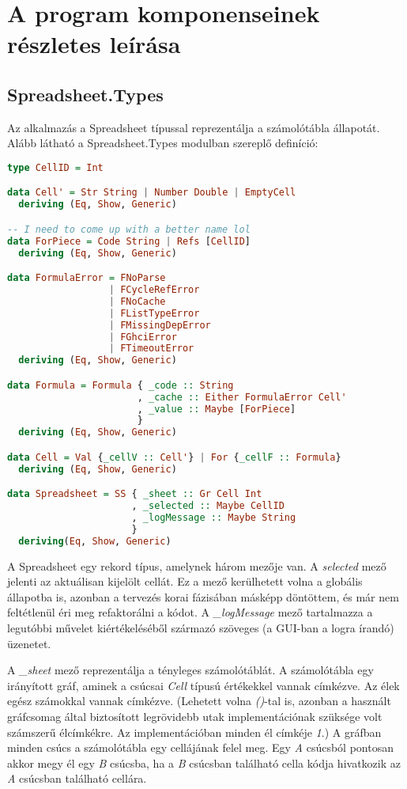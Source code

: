 \section{A program komponenseinek részletes leírása}

\subsection{Spreadsheet.Types}

Az alkalmazás a Spreadsheet típussal reprezentálja a számolótábla állapotát. Alább látható a Spreadsheet.Types modulban szereplő definíció:

\begin{lstlisting}[language={Haskell}]
type CellID = Int

data Cell' = Str String | Number Double | EmptyCell
  deriving (Eq, Show, Generic)

-- I need to come up with a better name lol
data ForPiece = Code String | Refs [CellID]
  deriving (Eq, Show, Generic)

data FormulaError = FNoParse
                  | FCycleRefError
                  | FNoCache
                  | FListTypeError
                  | FMissingDepError
                  | FGhciError
                  | FTimeoutError
  deriving (Eq, Show, Generic)

data Formula = Formula { _code :: String
                       , _cache :: Either FormulaError Cell'
                       , _value :: Maybe [ForPiece]
                       }
  deriving (Eq, Show, Generic)

data Cell = Val {_cellV :: Cell'} | For {_cellF :: Formula}
  deriving (Eq, Show, Generic)

data Spreadsheet = SS { _sheet :: Gr Cell Int
                      , _selected :: Maybe CellID
                      , _logMessage :: Maybe String
                      }
  deriving(Eq, Show, Generic)
\end{lstlisting}

A Spreadsheet egy rekord típus, amelynek három mezője van. A \textit{selected} mező jelenti az aktuálisan kijelölt cellát. Ez a mező kerülhetett volna a globális állapotba is, azonban a tervezés korai fázisában másképp döntöttem, és már nem feltétlenül éri meg refaktorálni a kódot. A \textit{\_logMessage} mező tartalmazza a legutóbbi művelet kiértékeléséből származó szöveges (a GUI-ban a logra írandó) üzenetet.

A \textit{\_sheet} mező reprezentálja a tényleges számolótáblát. A számolótábla egy irányított gráf, aminek a csúcsai \textit{Cell} típusú értékekkel vannak címkézve. Az élek egész számokkal vannak címkézve. (Lehetett volna \textit{()}-tal is, azonban a használt gráfcsomag által biztosított legrövidebb utak implementációnak szüksége volt számszerű élcímkékre. Az implementációban minden él címkéje \textit{1}.) A gráfban minden csúcs a számolótábla egy cellájának felel meg. Egy \textit{A} csúcsból pontosan akkor megy él egy \textit{B} csúcsba, ha a \textit{B} csúcsban található cella kódja hivatkozik az \textit{A} csúcsban található cellára. 

